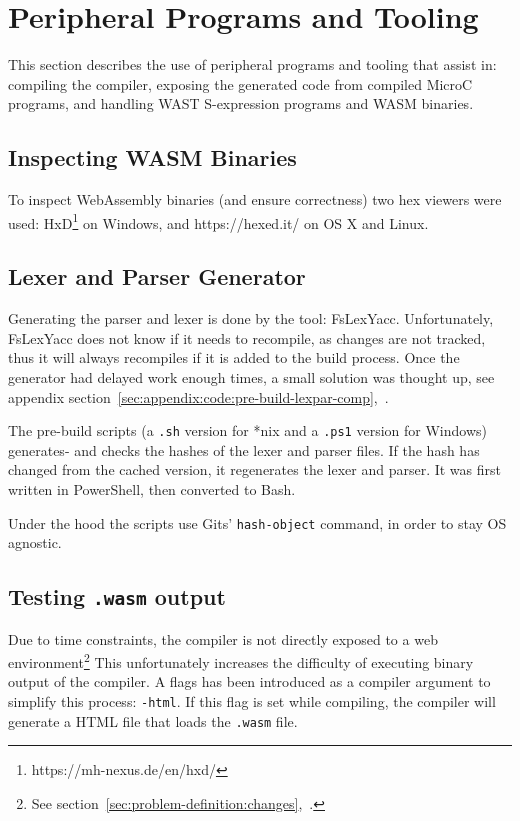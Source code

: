 \documentclass[a4paper]{article}
\begin{document}
\section{Peripheral Programs and Tooling}
\label{sec:peripherals}
This section describes the use of peripheral programs and tooling that assist in: compiling the compiler, exposing the generated code from compiled MicroC programs, and handling WAST S-expression programs and WASM binaries.

\subsection{Inspecting WASM Binaries}
\label{sec:peripherals:inspecting-wasm}
To inspect WebAssembly binaries (and ensure correctness) two hex viewers were used: HxD\footnote{https://mh-nexus.de/en/hxd/} on Windows, and https://hexed.it/ on OS X and Linux.

\subsection{Lexer and Parser Generator}
\label{sec:peripherals:lexpargen}
Generating the parser and lexer is done by the tool: FsLexYacc. Unfortunately, FsLexYacc does not know if it needs to recompile, as changes are not tracked, thus it will always recompiles if it is added to the build process. Once the generator had delayed work enough times, a small solution was thought up, see appendix section~\ref{sec:appendix:code:pre-build-lexpar-comp},~.

The pre-build scripts (a \texttt{.sh} version for *nix and a \texttt{.ps1} version for Windows) generates- and checks the hashes of the lexer and parser files. If the hash has changed from the cached version, it regenerates the lexer and parser. It was first written in PowerShell, then converted to Bash.

Under the hood the scripts use Gits' \texttt{hash-object} command, in order to stay OS agnostic.

\subsection{Testing \texttt{.wasm} output}
\label{sec:peripherals:testing-wasm}
Due to time constraints, the compiler is not directly exposed to a web environment\footnote{See section~\ref{sec:problem-definition:changes},~.} This unfortunately increases the difficulty of executing binary output of the compiler. A flags has been introduced as a compiler argument to simplify this process: \texttt{-html}. If this flag is set while compiling, the compiler will generate a HTML file that loads the \texttt{.wasm} file.
\end{document}
